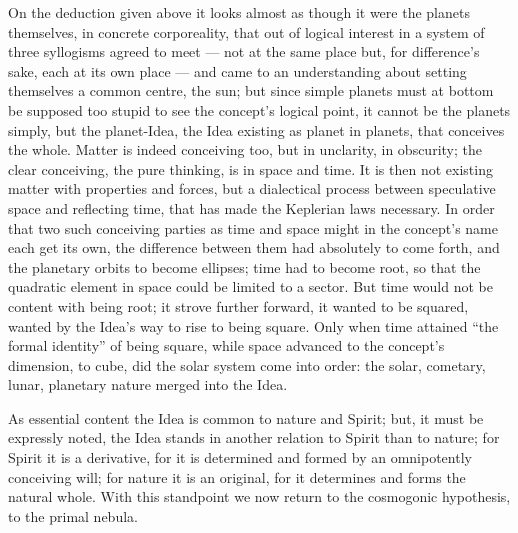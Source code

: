 \documentclass[12pt,a4paper]{book}
\begin{document}
On the deduction given above it looks almost as though it were the planets themselves, in concrete
corporeality, that out of logical interest in a system of three syllogisms agreed to meet --- not at the same
place but, for difference's sake, each at its own place --- and came to an understanding about setting
themselves a common centre, the sun; but since simple planets must at bottom be supposed too stupid to see the
concept's logical point, it cannot be
the planets simply, but the planet-Idea, the Idea existing as planet in planets, that conceives the whole.
Matter is indeed conceiving too, but in unclarity, in obscurity; the clear conceiving, the pure thinking, is
in space and time. It is then not existing matter with properties and forces, but a dialectical process
between speculative space and reflecting time, that has made the Keplerian laws necessary. In order that two
such conceiving parties as time and space might in the concept's name each get its own, the difference between
them had absolutely to come forth, and the planetary orbits to become ellipses; time had to become root, so
that the quadratic element in space could be limited to a sector. But time would not be content with being
root; it strove further forward, it wanted to be squared, wanted by the Idea's way to rise to being square.
Only when time attained ``the formal identity'' of being square, while space advanced to the concept's
dimension, to cube, did the solar system come into order: the solar, cometary, lunar, planetary nature merged
into the Idea.

As essential content the Idea is common to nature and Spirit; but, it must be expressly noted, the Idea stands
in another relation to Spirit than to nature; for Spirit it is a derivative, for it is determined and formed by
an omnipotently conceiving will; for nature it is an original, for it determines and forms the natural whole.
With this standpoint we now return to the cosmogonic hypothesis, to the primal nebula.
\end{document}
